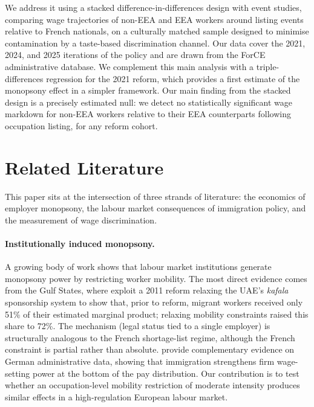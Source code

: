 \documentclass[9pt]{article}
\begin{document}
We address it using a stacked difference-in-differences design with event studies,
comparing wage trajectories of non-EEA and EEA workers around listing events
relative to French nationals, on a culturally matched sample designed to minimise
contamination by a taste-based discrimination channel.
Our data cover the 2021, 2024, and 2025 iterations of the policy and are drawn
from the ForCE administrative database. We complement this main analysis with a
triple-differences regression for the 2021 reform, which provides a first estimate
of the monopsony effect in a simpler framework. Our main finding from the stacked
design is a precisely estimated null: we detect no statistically significant wage
markdown for non-EEA workers relative to their EEA counterparts following occupation
listing, for any reform cohort.

\section{Related Literature}
\label{sec:lit}

This paper sits at the intersection of three strands of literature: the economics of
employer monopsony, the labour market consequences of immigration policy, and the
measurement of wage discrimination.

\paragraph{Institutionally induced monopsony.}
A growing body of work shows that labour market institutions generate monopsony
power by restricting worker mobility. The most direct evidence comes from the Gulf
States, where \citet{Naidu2016} exploit a 2011 reform relaxing the UAE's
\textit{kafala} sponsorship system to show that, prior to reform, migrant workers
received only 51\% of their estimated marginal product; relaxing mobility constraints
raised this share to 72\%. The mechanism (legal status tied to a single employer)
is structurally analogous to the French shortage-list regime, although the
French constraint is partial rather than absolute. \citet{Amior2024} provide
complementary evidence on German administrative data, showing that immigration
strengthens firm wage-setting power at the bottom of the pay distribution. Our
contribution is to test whether an occupation-level mobility restriction of moderate
intensity produces similar effects in a high-regulation European labour market.
\end{document}
